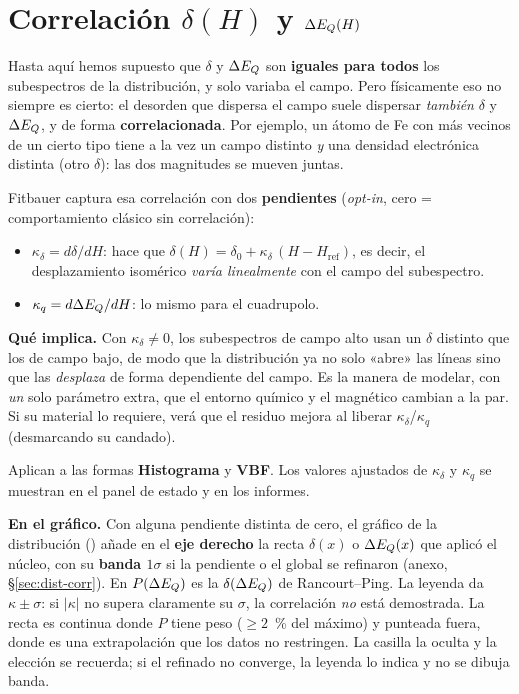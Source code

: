 \section{Correlación $\delta(H)$ y $\Delta E_{Q}(H)$}
\label{sec:correlacion}

Hasta aquí hemos supuesto que $\delta$ y $\Delta E_{Q}$ son \textbf{iguales para todos}
los subespectros de la distribución, y solo variaba el campo. Pero físicamente eso
no siempre es cierto: el desorden que dispersa el campo suele dispersar
\emph{también} $\delta$ y $\Delta E_{Q}$, y de forma \textbf{correlacionada}. Por ejemplo,
un átomo de Fe con más vecinos de un cierto tipo tiene a la vez un campo distinto
\emph{y} una densidad electrónica distinta (otro $\delta$): las dos magnitudes se
mueven juntas.

Fitbauer captura esa correlación con dos \textbf{pendientes} (\emph{opt-in}, cero =
comportamiento clásico sin correlación):

\begin{itemize}[nosep]
  \item $\kappa_\delta = d\delta/dH$: hace que $\delta(H) = \delta_0 +
        \kappa_\delta\,(H-H_{\text{ref}})$, es decir, el desplazamiento isomérico
        \emph{varía linealmente} con el campo del subespectro.
  \item $\kappa_q = d\Delta E_{Q}/dH$: lo mismo para el cuadrupolo.
\end{itemize}

\textbf{Qué implica.} Con $\kappa_\delta \neq 0$, los subespectros de campo alto
usan un $\delta$ distinto que los de campo bajo, de modo que la distribución ya no
solo «abre» las líneas sino que las \emph{desplaza} de forma dependiente del
campo. Es la manera de modelar, con \emph{un} solo parámetro extra, que el entorno
químico y el magnético cambian a la par. Si su material lo requiere, verá que el
residuo mejora al liberar $\kappa_\delta$/$\kappa_q$ (desmarcando su candado).

Aplican a las formas \textbf{Histograma} y \textbf{VBF}. Los valores ajustados de
$\kappa_\delta$ y $\kappa_q$ se muestran en el panel de estado y en los informes.

\textbf{En el gráfico.} Con alguna pendiente distinta de cero, el gráfico de la
distribución () añade en el \textbf{eje derecho} la recta
$\delta(x)$ o $\Delta E_{Q}(x)$ que aplicó el núcleo, con su \textbf{banda $1\sigma$} si la
pendiente o el global se refinaron (anexo, §\ref{sec:dist-corr}). En $P(\Delta E_{Q})$ es
la $\delta(\Delta E_{Q})$ de Rancourt--Ping. La leyenda da $\kappa\pm\sigma$: si $|\kappa|$
no supera claramente su $\sigma$, la correlación \emph{no} está demostrada. La
recta es continua donde $P$ tiene peso ($\ge 2$~\% del máximo) y punteada fuera,
donde es una extrapolación que los datos no restringen. La casilla
 la oculta y la elección se recuerda; si el
refinado no converge, la leyenda lo indica y no se dibuja banda.

